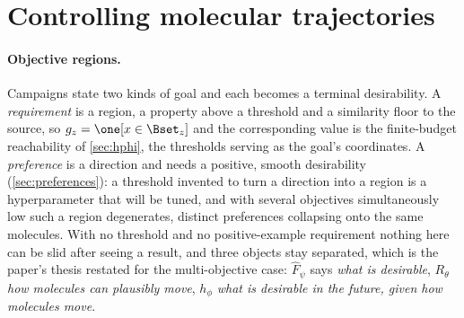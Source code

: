 %
\section{Controlling molecular trajectories}
\label{sec:trajectories}

\paragraph{Objective regions.}
\label{sec:regions}
Campaigns state two kinds of goal and each becomes a terminal desirability. A \emph{requirement} is a region, a property above a threshold and a similarity floor to the source, so $g_z=\one[x\in\Bset_z]$ and the corresponding value is the finite-budget reachability of \cref{sec:hphi}, the thresholds serving as the goal's coordinates. A \emph{preference} is a direction and needs a positive, smooth desirability (\cref{sec:preferences}): a threshold invented to turn a direction into a region is a hyperparameter that will be tuned, and with several objectives simultaneously low such a region degenerates, distinct preferences collapsing onto the same molecules.
With no threshold and no positive-example requirement nothing here can be slid after seeing a result, and three objects stay separated, which is the paper's thesis restated for the multi-objective case: $\widehat F_\psi$ says \emph{what is desirable}, $R_\theta$ \emph{how molecules can plausibly move}, $h_\phi$ \emph{what is desirable in the future, given how molecules move}.

